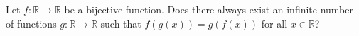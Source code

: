 Let $f:\mathbb{R}\to\mathbb{R}$ be a bijective function. Does there always exist an infinite number of functions $g:\mathbb{R}\to\mathbb{R}$ such that $f(g(x))=g(f(x))$ for all $x\in\mathbb{R}$?

